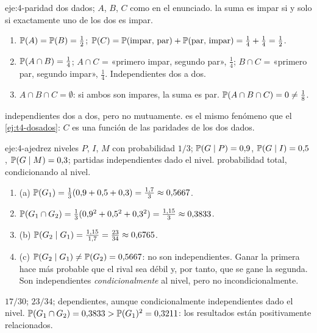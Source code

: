 \begin{solucion}{eje:4-paridad}
\datos dos dados; $A$, $B$, $C$ como en el enunciado.
\planteamiento la suma es impar si y solo si exactamente uno de los dos es impar.
\pasos
\begin{enumerate}[label=\arabic*.]
  \item $\mathbb{P}(A)=\mathbb{P}(B)=\frac12$; $\mathbb{P}(C)=\mathbb{P}(\text{impar, par})+\mathbb{P}(\text{par, impar})=\frac14+\frac14=\frac12$.
  \item $\mathbb{P}(A\cap B)=\frac14$; $A\cap C$ = «primero impar, segundo par», $\frac14$; $B\cap C$ = «primero par, segundo impar», $\frac14$. Independientes dos a dos.
  \item $A\cap B\cap C=\emptyset$: si ambos son impares, la suma es par. $\mathbb{P}(A\cap B\cap C)=0\neq\frac18$.
\end{enumerate}
\resultado independientes dos a dos, pero no mutuamente.
\comprobacion es el mismo fenómeno que el \cref{ej:t4-dosados}: $C$ es una función de las paridades de los dos dados.
\end{solucion}

\begin{solucion}{eje:4-ajedrez}
\datos niveles $P$, $I$, $M$ con probabilidad $1/3$; $\mathbb{P}(G\mid P)=0{,}9$, $\mathbb{P}(G\mid I)=0{,}5$, $\mathbb{P}(G\mid M)=0{,}3$; partidas independientes dado el nivel.
\planteamiento probabilidad total, condicionando al nivel.
\pasos
\begin{enumerate}[label=\arabic*.]
  \item (a) $\mathbb{P}(G_1)=\frac13(0{,}9+0{,}5+0{,}3)=\frac{1{,}7}3\approx0{,}5667$.
  \item $\mathbb{P}(G_1\cap G_2)=\frac13(0{,}9^{2}+0{,}5^{2}+0{,}3^{2})=\frac{1{,}15}3\approx0{,}3833$.
  \item (b) $\mathbb{P}(G_2\mid G_1)=\frac{1{,}15}{1{,}7}=\frac{23}{34}\approx0{,}6765$.
  \item (c) $\mathbb{P}(G_2\mid G_1)\neq\mathbb{P}(G_2)=0{,}5667$: no son independientes. Ganar la primera hace más probable que el rival sea débil y, por tanto, que se gane la segunda. Son independientes \emph{condicionalmente} al nivel, pero no incondicionalmente.
\end{enumerate}
\resultado $17/30$; $23/34$; dependientes, aunque condicionalmente independientes dado el nivel.
\comprobacion $\mathbb{P}(G_1\cap G_2)=0{,}3833>\mathbb{P}(G_1)^{2}=0{,}3211$: los resultados están positivamente relacionados.
\end{solucion}

